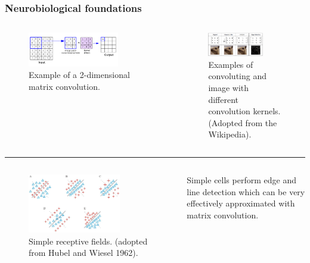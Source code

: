 \documentclass[a4paper,9pt]{beamer}
\theoremstyle{mytheoremstyle}
\begin{document}
\begin{frame}
\frametitle{Neurobiological foundations}
\begin{columns}
\begin{figure}
\begin{center}
  \includegraphics[width=0.75\textwidth]{res/convolution.png}
\end{center}
	\caption{Example of a 2-dimensional matrix convolution.}
\end{figure}
\begin{figure}
\begin{center}
  \includegraphics[width=0.75\textwidth]{res/convolution_kernels_examples.png}
\end{center}
	\caption{Examples of convoluting and image with different convolution kernels. (Adopted from the Wikipedia).}
\end{figure}
\end{columns}
\hrule
\begin{columns}
\begin{figure}
\begin{center}
  \includegraphics[width=0.75\textwidth]{res/simple_cells.png}
\end{center}
	\caption{Simple receptive fields. (adopted from Hubel and Wiesel 1962).}
\end{figure}
\vspace{0.7cm}
\begin{block}{}
Simple cells perform edge and line detection which can be very effectively approximated with matrix convolution.
\end{block}
\end{columns}
\end{frame}
\end{document}
